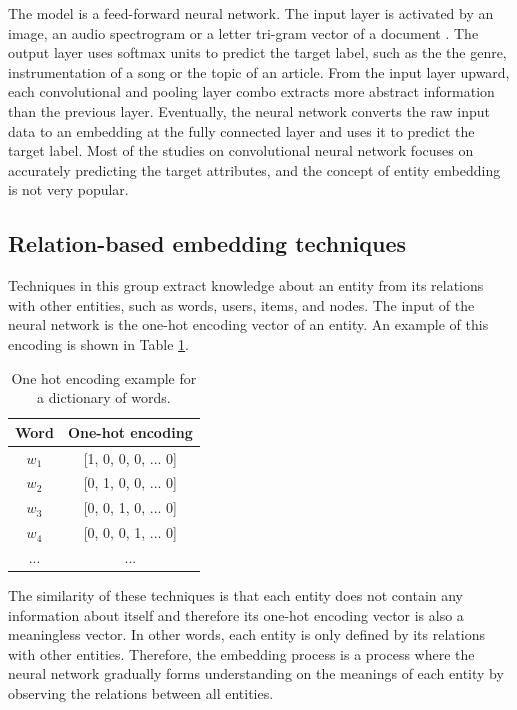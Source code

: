 \documentclass[conference]{IEEEtran}
\begin{document}
The model is a feed-forward neural network.
The input layer is activated by
an image,
an audio spectrogram \cite{van2013deep} or
a letter tri-gram vector of a document \cite{elkahky2015multi}.
The output layer uses softmax units to predict the target label,
such as the the genre, instrumentation of a song or the topic of an article.
From the input layer upward,
each convolutional and pooling layer combo extracts more abstract information
than the previous layer.
Eventually, the neural network converts the raw input data to an embedding
at the fully connected layer and uses it to predict the target label.
Most of the studies on convolutional neural network focuses on accurately
predicting the target attributes,
and the concept of entity embedding is not very popular.

\subsection{Relation-based embedding techniques}
Techniques in this group extract knowledge about an entity from its relations 
with other entities, such as words, users, items, and nodes.
The input of the neural network is the one-hot encoding vector of an entity.
An example of this encoding is shown in Table \ref{tab:one-hot}.
\begin{table}[!ht]
	\centering
	\caption{One hot encoding example for a dictionary of words.}
	\begin{tabular}{cc} \hline \rowcolor{blue!30}
		Word & One-hot encoding \\ \hline
		$ w_1 $ & [1, 0, 0, 0, ... 0]       \\ \hline
		$ w_2 $ & [0, 1, 0, 0, ... 0]       \\ \hline
		$ w_3 $ & [0, 0, 1, 0, ... 0]       \\ \hline
		$ w_4 $ & [0, 0, 0, 1, ... 0]       \\ \hline
		... & ...       \\ \hline
	\end{tabular}
	\label{tab:one-hot}
\end{table}
The similarity of these techniques is that each entity does not contain any
information about itself and therefore its one-hot encoding vector is also
a meaningless vector.
In other words, each entity is only defined by its relations with other entities.
Therefore, the embedding process is a process where the neural network gradually
forms understanding on the meanings of each entity by observing the relations
between all entities.
\end{document}

